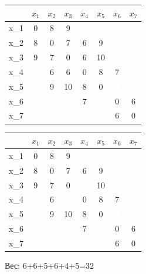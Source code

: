 \documentclass[12pt]{article}
\begin{document}
\begin{center}
        \begin{tabular}{ |c|c|c|c|c|c|c|c| }
                \hline
				 & $x_1$ & $x_2$ & $x_3$ & $x_4$ & $x_5$ & $x_6$ & $x_7$\\
                \hline
				x_1 & 0 & 8 & 9 & \infty & \infty & \infty & \cellcolor{black}\textcolor{white}6 \\
                \hline
				x_2 & 8 & 0 & 7 & 6 & 9 & \infty & \infty \\
                \hline
				x_3 & 9 & 7 & 0 & \cellcolor{gray}6 & 10 & \cellcolor{black}\textcolor{white}5 & \infty \\
                \hline
				x_4 & \infty & 6 & \cellcolor{gray}6 & 0 & 8 & 7 & \infty \\
                \hline
				x_5 & \infty & 9 & 10 & 8 & 0 & \cellcolor{black}\textcolor{white}4 & \cellcolor{black}\textcolor{white}5 \\
                \hline
				x_6 & \infty & \infty & \cellcolor{black}\textcolor{white}5 & 7 & \cellcolor{black}\textcolor{white}4 & 0 & 6\\
                \hline
				x_7 & \cellcolor{black}\textcolor{white}6 & \infty & \infty & \infty & \cellcolor{black}\textcolor{white}5 & 6 & 0\\
                \hline
        \end{tabular}
\end{center}

\begin{center}
        \begin{tabular}{ |c|c|c|c|c|c|c|c| }
                \hline
				 & $x_1$ & $x_2$ & $x_3$ & $x_4$ & $x_5$ & $x_6$ & $x_7$\\
                \hline
				x_1 & 0 & 8 & 9 & \infty & \infty & \infty & \cellcolor{black}\textcolor{white}6 \\
                \hline
				x_2 & 8 & 0 & 7 & \cellcolor{gray}6 & 9 & \infty & \infty \\
                \hline
				x_3 & 9 & 7 & 0 & \cellcolor{black}\textcolor{white}6 & 10 & \cellcolor{black}\textcolor{white}5 & \infty \\
                \hline
				x_4 & \infty & \cellcolor{gray}6 & \cellcolor{black}\textcolor{white}6 & 0 & 8 & 7 & \infty \\
                \hline
				x_5 & \infty & 9 & 10 & 8 & 0 & \cellcolor{black}\textcolor{white}4 & \cellcolor{black}\textcolor{white}5 \\
                \hline
				x_6 & \infty & \infty & \cellcolor{black}\textcolor{white}5 & 7 & \cellcolor{black}\textcolor{white}4 & 0 & 6\\
                \hline
				x_7 & \cellcolor{black}\textcolor{white}6 & \infty & \infty & \infty & \cellcolor{black}\textcolor{white}5 & 6 & 0\\
                \hline
        \end{tabular}
\end{center}

Вес: 6+6+5+6+4+5=32
\end{document}
